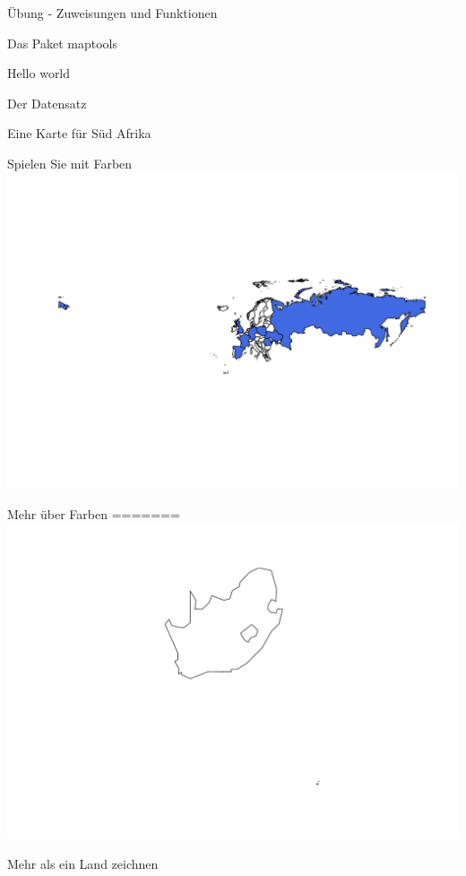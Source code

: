 \documentclass[ignorenonframetext,]{beamer}
\begin{document}
\begin{frame}[fragile]{Übung - Zuweisungen und Funktionen}
\begin{frame}[fragile]{Das Paket maptools}
\begin{frame}[fragile]{Hello world}
\begin{frame}[fragile]{Der Datensatz}
\begin{frame}[fragile]{Eine Karte für Süd Afrika}
\begin{frame}[fragile]{Spielen Sie mit Farben}
\includegraphics{Geomedizin_files/figure-beamer/unnamed-chunk-77-2.pdf}

\end{frame}

\begin{frame}[fragile]{Mehr über Farben}
\protect\hypertarget{mehr-uber-farben}{}
=======
\includegraphics{Geomedizin_files/figure-beamer/unnamed-chunk-92-1.pdf}

\end{frame}

\begin{frame}{Mehr als ein Land zeichnen}


\end{frame}
\end{frame}
\end{frame}
\end{frame}
\end{frame}
\end{frame}
\end{document}

